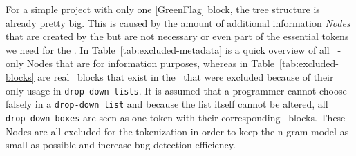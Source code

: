 For a simple \scratch{} project with only one [GreenFlag] block, the tree structure is already pretty big. This is caused by the amount of additional information \textit{Nodes} that are created by the \litterbox{} \AST{} but are not necessary or even part of the essential tokens we need for the \ngram{}. In Table~\ref{tab:excluded-metadata} is a quick overview of all \AST\ -only Nodes that are for information purposes, whereas in Table~\ref{tab:excluded-blocks} are real \scratch\ blocks that exist in the \AST\ that were excluded because of their only usage in \texttt{drop-down lists}. It is assumed that a programmer cannot choose falsely in a \texttt{drop-down list} and because the list itself cannot be altered, all \texttt{drop-down boxes} are seen as one token with their corresponding \scratch\ blocks. These Nodes are all excluded for the tokenization in order to keep the n-gram model as small as possible and increase bug detection efficiency.   

